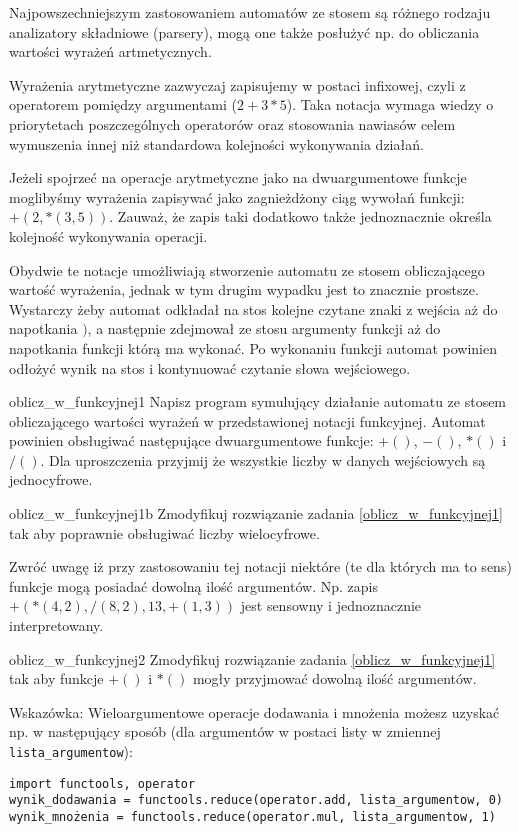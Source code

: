 \documentclass{pdfBooklets}
\begin{document}
Najpowszechniejszym zastosowaniem automatów ze stosem są różnego rodzaju analizatory składniowe (parsery), mogą one także posłużyć np. do obliczania wartości wyrażeń artmetycznych.

Wyrażenia arytmetyczne zazwyczaj zapisujemy w postaci infixowej, czyli z operatorem pomiędzy argumentami ($2 + 3 * 5$). Taka notacja wymaga wiedzy o priorytetach poszczególnych operatorów oraz stosowania nawiasów celem wymuszenia innej niż standardowa kolejności wykonywania działań.

Jeżeli spojrzeć na operacje arytmetyczne jako na dwuargumentowe funkcje moglibyśmy wyrażenia zapisywać jako zagnieżdżony ciąg wywołań funkcji: $+(2, *(3, 5))$. Zauważ, że zapis taki dodatkowo także jednoznacznie określa kolejność wykonywania operacji.

Obydwie te notacje umożliwiają stworzenie automatu ze stosem obliczającego wartość wyrażenia, jednak w tym drugim wypadku jest to znacznie prostsze. Wystarczy żeby automat odkładał na stos kolejne czytane znaki z wejścia aż do napotkania $)$, a następnie zdejmował ze stosu argumenty funkcji aż do napotkania funkcji którą ma wykonać. Po wykonaniu funkcji automat powinien odłożyć wynik na stos i kontynuować czytanie słowa wejściowego.

\begin{Zadanie}{}{oblicz_w_funkcyjnej1}
Napisz program symulujący działanie automatu ze stosem obliczającego wartości wyrażeń w przedstawionej notacji funkcyjnej. Automat powinien obsługiwać następujące dwuargumentowe funkcje: $+()$, $-()$, $*()$ i $/()$. Dla uproszczenia przyjmij że wszystkie liczby w danych wejściowych są jednocyfrowe.
\end{Zadanie}

\begin{Zadanie}{}{oblicz_w_funkcyjnej1b}
Zmodyfikuj rozwiązanie zadania \ref{oblicz_w_funkcyjnej1} tak aby poprawnie obsługiwać liczby wielocyfrowe.
\end{Zadanie}

Zwróć uwagę iż przy zastosowaniu tej notacji niektóre (te dla których ma to sens) funkcje mogą posiadać dowolną ilość argumentów. Np. zapis $+(*(4,2), /(8,2), 13, +(1,3))$ jest sensowny i jednoznacznie interpretowany.

\begin{Zadanie}[breakable]{}{oblicz_w_funkcyjnej2}
Zmodyfikuj rozwiązanie zadania \ref{oblicz_w_funkcyjnej1} tak aby funkcje $+()$ i $*()$ mogły przyjmować dowolną ilość argumentów.

\vspace{6pt}

Wskazówka: Wieloargumentowe operacje dodawania i mnożenia możesz uzyskać np. w następujący sposób (dla argumentów w postaci listy w zmiennej \Verb#lista_argumentow#):
\begin{verbatim}
import functools, operator
wynik_dodawania = functools.reduce(operator.add, lista_argumentow, 0)
wynik_mnożenia = functools.reduce(operator.mul, lista_argumentow, 1)
\end{verbatim}
\end{Zadanie}
\end{document}
